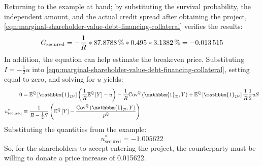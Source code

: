 \documentclass[../main.tex]{subfiles}
\begin{document}
        Returning to the example at hand;
        by substituting the survival probability, the independent amount, 
        and the actual credit spread after obtaining the project, 
        \cref{eqn:marginal-shareholder-value-debt-financing-collateral} verifies the results:
            \begin{equation}
                G_{\text{secured}}
                =
                - 
                \discountfactor
                *
                \pct{0.878788}
                *
                \num{0.495}
                *
                \pct{0.031382}
                =
                -\num{0.013515}
            \end{equation}
        In addition, the equation can help estimate the breakeven price.
        Substituting $I=-\frac{1}{2} u$ into 
        \cref{eqn:marginal-shareholder-value-debt-financing-collateral}, 
        setting equal to zero, and solving for $u$ yields:
            \begin{align}
                0
                &=
                    \mathbb{E}^{\mathbb{Q}}\left[\mathbbm{1}_{\mathcal{D}^{c}}\right] 
                    \left(
                        \discountfactor
                        \mathbb{E}^{\mathbb{Q}}\left[Y\right] 
                        - u
                    \right)
                    -
                    \discountfactor
                    \text{Cov}^{\mathbb{Q}}\left(\mathbbm{1}_{\mathcal{D}}, Y\right) 
                    +
                    \mathbb{E}^{\mathbb{Q}}\left[
                        \mathbbm{1}_{\mathcal{D}^{c}}
                    \right] \discountfactor \frac{1}{2} u S
                    \nonumber \\
                u^{\ast}_{\text{secured}}
                &\equiv
                    \frac{
                        1
                    }{
                        \grossrfrate - \frac{1}{2} S
                    } 
                    \left(
                        \mathbb{E}^{\mathbb{Q}}\left[Y\right]
                        - \frac{
                            \text{Cov}^{\mathbb{Q}}\left(\mathbbm{1}_{\mathcal{D}}, Y\right)
                        }{
                            p^{\mathbb{Q}}  
                        } 
                    \right)
            \end{align}
        Substituting the quantities from the example:
            \begin{equation*}
                u^{\ast}_{\text{secured}}
                =
                \num{-1.005622}
            \end{equation*}    
        So, for the shareholders to accept entering the project,
        the counterparty must be willing to donate a price increase of \num{0.015622}.
        
\end{document}
